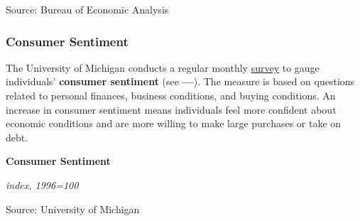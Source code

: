 \documentclass{report}
\makeatletter
\newcommand{\tbllink}[1]{\href{https://raw.githubusercontent.com/bdecon/US-chartbook/master/chartbook/data/#1}{\faTable}}
\newcommand*\short[1]{\expandafter\@gobbletwo\number\numexpr#1\relax}
\newcommand{\dateaxisticks}{
		date coordinates in=x, axis line style={draw=none},
		xmax={2020-10-01},
		max space between ticks=40,	    
		xtick={{1990-01-01}, {1992-01-01}, {1994-01-01}, 
			{1996-01-01}, {1998-01-01}, {2000-01-01}, 
			{2002-01-01}, {2004-01-01}, {2006-01-01},
			{2008-01-01}, {2010-01-01}, {2012-01-01}, {2014-01-01},
		    {2016-01-01}, {2018-01-01}, {2020-01-01}},
		minor xtick={{1989-01-01}, {1991-01-01}, {1993-01-01},
			{1995-01-01}, {1997-01-01}, {1999-01-01}, 
			{2001-01-01}, {2003-01-01}, {2005-01-01}, {2007-01-01},
		    {2009-01-01}, {2011-01-01}, {2013-01-01}, {2015-01-01},
		    {2017-01-01}, {2019-01-01}},
		enlarge y limits={0.06}, enlarge x limits={0.01},
		}
\newcommand{\bbar}[2]{extra #1 ticks = {{#2}}, extra #1 tick labels = ,
		extra #1 tick style = {grid=major, grid style={thick, black!25}},}
\newcommand{\stdline}[4]{\addplot[very thick, no markers, color=#1] 
		table [x=#2, y=#3, col sep=comma] {#4};	}
\newcommand{\rbars}{
		\fill[color=black!10] (axis cs:{1990-07-01},\pgfkeysvalueof{/pgfplots/ymin}) rectangle 
			(axis cs:{1991-03-01}, \pgfkeysvalueof{/pgfplots/ymax});
		\fill[color=black!10] (axis cs:{2007-12-01},\pgfkeysvalueof{/pgfplots/ymin}) rectangle 
			(axis cs:{2009-07-01}, \pgfkeysvalueof{/pgfplots/ymax});
		\fill[color=black!10] (axis cs:{2001-03-01},\pgfkeysvalueof{/pgfplots/ymin}) rectangle 
			(axis cs:{2001-11-01}, \pgfkeysvalueof{/pgfplots/ymax});
		\fill[color=black!10] (axis cs:{2020-02-01},\pgfkeysvalueof{/pgfplots/ymin}) rectangle 
			(axis cs:{2020-10-01}, \pgfkeysvalueof{/pgfplots/ymax});}
\makeatother
\begin{document}
{{{\begin{minipage}{0.76\textwidth}
\hspace*{-2mm} 

\footnotesize{Source: Bureau of Economic Analysis} \hfill \tbllink{psavert.csv}

\vspace{7mm}


\subsubsection*{\color{black!70} \seriffont Consumer Sentiment}

\small The University of Michigan conducts a regular monthly \href{http://www.sca.isr.umich.edu/}{survey} to gauge individuals' \textbf{consumer sentiment} (see {\color{violet!60!blue}\textbf{---}}). The measure is based on questions related to personal finances, business conditions, and buying conditions. An increase in consumer sentiment means individuals feel more confident about economic conditions and are more willing to make large purchases or take on debt. 

\vspace{4mm}

\normalsize \textbf{Consumer Sentiment}

\footnotesize{\textit{index, 1996=100}}

\hspace*{-2mm} 

\footnotesize{Source: University of Michigan} \hfill \tbllink{umichsoc.csv}
\end{minipage}

}}}
\end{document}
